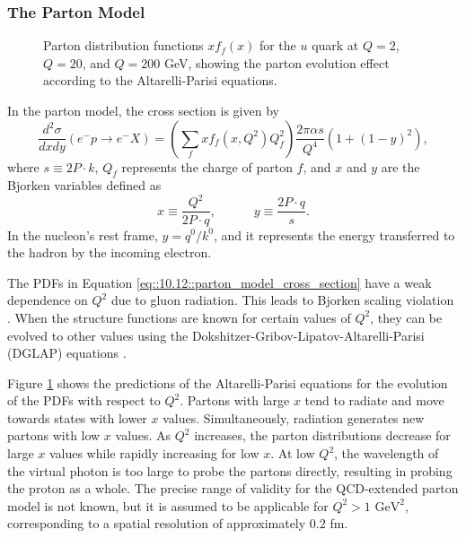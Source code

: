 \subsubsection{The Parton Model}
\label{10.12::parton_model}
    \begin{figure}[t!]
        \centering
        \caption[$Q^2$ dependence of $x$ PDF for the $u$ quark.]{Parton distribution functions $xf_f(x)$ for the $u$ quark at $Q = 2$, $Q = 20$, and $Q = 200$ GeV, showing the parton evolution effect according to the Altarelli-Parisi equations.} %
        \label{fig::10.12::q2_dependence}
    \end{figure}

    In the parton model, the cross section is given by
    \begin{equation}
        \label{eq::10.12::parton_model_cross_section}
        \frac{d^2\sigma}{dxdy} \left( e^-p \rightarrow e^-X \right) =
                \left( \sum_f xf_f \left( x, Q^2 \right) Q_f^2 \right)
                \frac{2\pi\alpha s}{Q^4} \left( 1 + \left( 1 - y \right)^2 \right),
    \end{equation}
    where $s \equiv 2P\cdot k$, $Q_f$ represents the charge of parton $f$, and $x$ and $y$ are the Bjorken variables defined as
    \begin{equation*}
        x \equiv \frac{Q^2}{2P\cdot q}, \hspace{36pt} y \equiv \frac{2 P\cdot q}{s}.
    \end{equation*}
    In the nucleon's rest frame, $y = q^0/k^0$, and it represents the energy transferred to the hadron by the incoming electron.

    The PDFs in Equation \eqref{eq::10.12::parton_model_cross_section} have a weak dependence on $Q^2$ due to gluon radiation.
    This leads to Bjorken scaling violation \cite{halzen1991}.
    When the structure functions are known for certain values of $Q^2$, they can be evolved to other values using the Dokshitzer-Gribov-Lipatov-Altarelli-Parisi (DGLAP) equations \cite{dokshitzer1991}.

    Figure \ref{fig::10.12::q2_dependence} shows the predictions of the Altarelli-Parisi equations for the evolution of the PDFs with respect to $Q^2$.
    Partons with large $x$ tend to radiate and move towards states with lower $x$ values.
    Simultaneously, radiation generates new partons with low $x$ values.
    As $Q^2$ increases, the parton distributions decrease for large $x$ values while rapidly increasing for low $x$.
    At low $Q^2$, the wavelength of the virtual photon is too large to probe the partons directly, resulting in probing the proton as a whole.
    The precise range of validity for the QCD-extended parton model is not known, but it is assumed to be applicable for $Q^2 > 1 \text{ GeV}^2$, corresponding to a spatial resolution of approximately $0.2$ fm.
